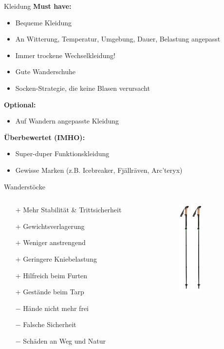 \documentclass{beamer}
\begin{document}
			\begin{frame}{Kleidung}
				\textbf{Must have:}
				\begin{itemize}
					\item Bequeme Kleidung
					\item An Witterung, Temperatur, Umgebung, Dauer, Belastung angepasst
					\item Immer trockene Wechselkleidung!
					\item Gute Wanderschuhe
					\item Socken-Strategie, die keine Blasen verursacht
				\end{itemize}\pause
				\textbf{Optional:}
				\begin{itemize}
					\item Auf Wandern angepasste Kleidung
				\end{itemize}\pause
				\textbf{Überbewertet (IMHO):}
				\begin{itemize}
					\item Super-duper Funktionskleidung
					\item Gewisse Marken (z.B. Icebreaker, Fjällräven, Arc'teryx)
				\end{itemize}
			\end{frame}
			
			\begin{frame}{Wanderstöcke}
				\begin{columns}[c]
					\begin{column}{0.69\textwidth}
						\begin{itemize}
							\item[$+$] Mehr Stabilität \& Trittsicherheit
							\item[$+$] Gewichtsverlagerung
							\item[$+$] Weniger anstrengend
							\item[$+$] Geringere Kniebelastung
							\item[$+$] Hilfreich beim Furten
							\item[$+$] Gestände beim Tarp\pause
							\item[$-$] Hände nicht mehr frei
							\item[$-$] Falsche Sicherheit
							\item[$-$] Schäden an Weg und Natur
						\end{itemize}
					\end{column}
					\begin{column}{0.29\textwidth}
						\includegraphics[width=1.25cm]{images/hiking-sticks.png}
					\end{column}
				\end{columns}
			\end{frame}
		
\end{document}
